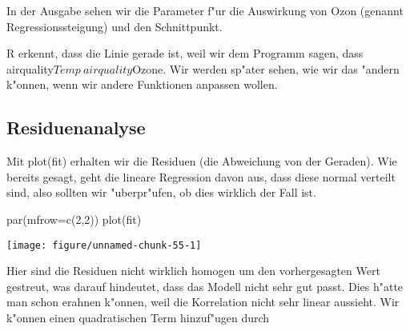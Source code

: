 \documentclass[a4paper,twoside]{tufte-book}\usepackage[]{graphicx}\usepackage[]{color}
\makeatletter
\def\maxwidth{ %
  \ifdim\Gin@nat@width>\linewidth
    \linewidth
  \else
    \Gin@nat@width
  \fi
}
\makeatother
\begin{document}
\begin{appendices}
\begin{Schunk}
\end{Schunk}

In der Ausgabe sehen wir die Parameter f"ur die Auswirkung von Ozon (genannt Regressionssteigung) und den Schnittpunkt.

R erkennt, dass die Linie gerade ist, weil wir dem Programm sagen, dass airquality$Temp~airquality$Ozone. Wir werden sp"ater sehen, wie wir das "andern k"onnen, wenn wir andere Funktionen anpassen wollen. 

\subsection{Residuenanalyse}

Mit plot(fit) erhalten wir die Residuen (die Abweichung von der Geraden). Wie bereits gesagt, geht die lineare Regression davon aus, dass diese normal verteilt sind, also sollten wir "uberpr"ufen, ob dies wirklich der Fall ist.

\begin{Schunk}
\begin{Sinput}
par(mfrow=c(2,2))
plot(fit)
\end{Sinput}

\texttt{[image: figure/unnamed-chunk-55-1]} \end{Schunk}

Hier sind die Residuen nicht wirklich homogen um den vorhergesagten Wert gestreut, was darauf hindeutet, dass das Modell nicht sehr gut passt. Dies h"atte man schon erahnen k"onnen, weil die Korrelation nicht sehr linear aussieht. Wir k"onnen einen quadratischen Term hinzuf"ugen durch


\begin{Schunk}
\begin{Soutput}


\end{Soutput}
\end{Schunk}
\end{appendices}
\end{document}
